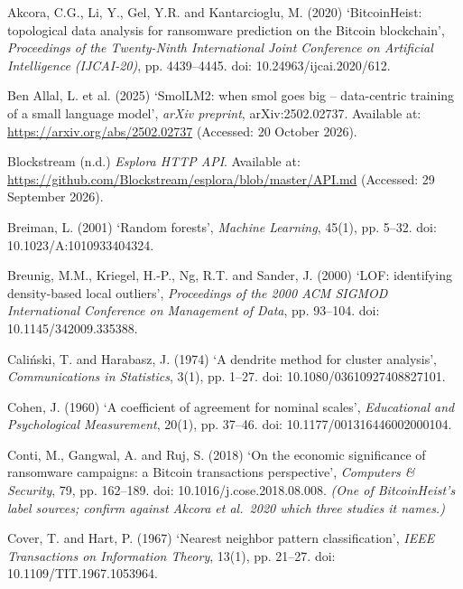 \begin{references}
\item Akcora, C.G., Li, Y., Gel, Y.R. and Kantarcioglu, M. (2020) ‘BitcoinHeist: topological data analysis for ransomware prediction on the Bitcoin blockchain’, \textit{Proceedings of the Twenty-Ninth International Joint Conference on Artificial Intelligence (IJCAI-20)}, pp. 4439–4445. doi: 10.24963/ijcai.2020/612.

\item Ben Allal, L. et al. (2025) ‘SmolLM2: when smol goes big -- data-centric training of a small language model’, \textit{arXiv preprint}, arXiv:2502.02737. Available at: \url{https://arxiv.org/abs/2502.02737} (Accessed: 20 October 2026). \textdagger

\item Blockstream (n.d.) \textit{Esplora HTTP API}. Available at: \url{https://github.com/Blockstream/esplora/blob/master/API.md} (Accessed: 29 September 2026). \textdaggerdbl

\item Breiman, L. (2001) ‘Random forests’, \textit{Machine Learning}, 45(1), pp. 5–32. doi: 10.1023/A:1010933404324.

\item Breunig, M.M., Kriegel, H.-P., Ng, R.T. and Sander, J. (2000) ‘LOF: identifying density-based local outliers’, \textit{Proceedings of the 2000 ACM SIGMOD International Conference on Management of Data}, pp. 93–104. doi: 10.1145/342009.335388. \textdaggerdbl

\item Caliński, T. and Harabasz, J. (1974) ‘A dendrite method for cluster analysis’, \textit{Communications in Statistics}, 3(1), pp. 1–27. doi: 10.1080/03610927408827101.

\item Cohen, J. (1960) ‘A coefficient of agreement for nominal scales’, \textit{Educational and Psychological Measurement}, 20(1), pp. 37–46. doi: 10.1177/001316446002000104.

\item Conti, M., Gangwal, A. and Ruj, S. (2018) ‘On the economic significance of ransomware campaigns: a Bitcoin transactions perspective’, \textit{Computers \& Security}, 79, pp. 162–189. doi: 10.1016/j.cose.2018.08.008. \emph{(One of BitcoinHeist's label sources; confirm against Akcora et al.\ 2020 which three studies it names.)}

\item Cover, T. and Hart, P. (1967) ‘Nearest neighbor pattern classification’, \textit{IEEE Transactions on Information Theory}, 13(1), pp. 21–27. doi: 10.1109/TIT.1967.1053964.


\end{references}
